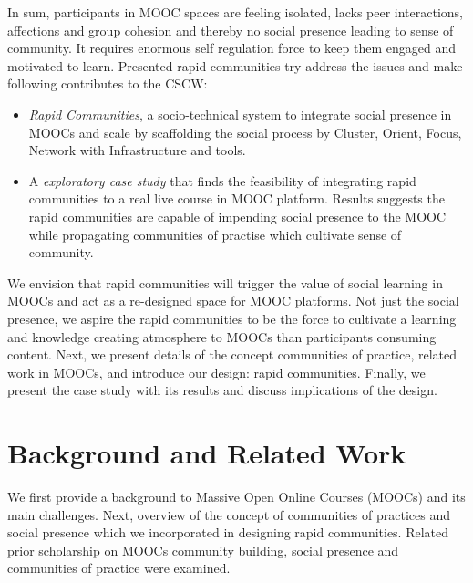 \documentclass[manuscript,screen,review]{acmart}
\begin{document}
In sum, participants in MOOC spaces are feeling isolated, lacks peer interactions, affections and group cohesion  and thereby no social presence leading to sense of community. It requires enormous self regulation force to keep them engaged and motivated to learn. Presented rapid communities try address the issues and make following contributes to the CSCW: 

\begin{itemize}
\item \textit{Rapid Communities}, a socio-technical system to integrate social presence in MOOCs and scale by scaffolding the social process by Cluster, Orient, Focus, Network with Infrastructure and tools.  
\item A \textit{exploratory case study} that finds the feasibility of integrating rapid communities to a real live course in MOOC platform. Results suggests the rapid communities are capable of impending social presence to the MOOC while propagating communities of practise which cultivate sense of community.
\end{itemize}

We envision that rapid communities will trigger the value of social learning in MOOCs and act as a re-designed space for MOOC platforms. Not just the social presence, we aspire the rapid communities to be the force to cultivate a learning and knowledge creating atmosphere to MOOCs than participants consuming content. Next, we present details of the concept communities of practice, related work in MOOCs, and introduce our design: rapid communities. Finally, we present the case study with its results and discuss implications of the design.

\section{Background and Related Work}
We first provide a background to Massive Open Online Courses (MOOCs) and its main challenges. Next, overview of the concept of communities of practices and social presence which we incorporated in designing rapid communities. Related prior scholarship on MOOCs community building, social presence and communities of practice were examined. 
\end{document}

